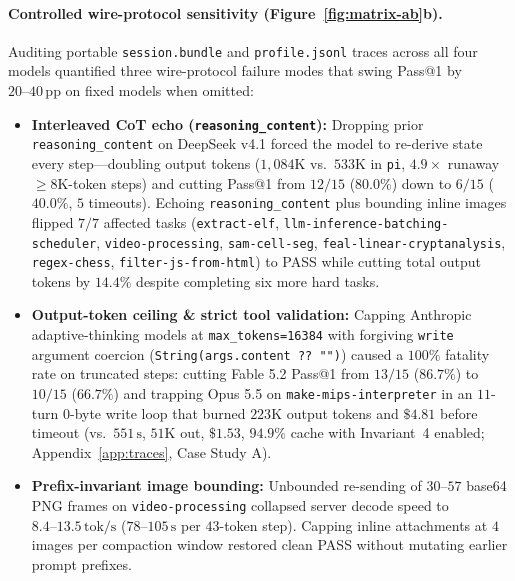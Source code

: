 \documentclass[11pt]{article}
\newcommand{\code}[1]{\nolinkurl{#1}}
\begin{document}
\paragraph{Controlled wire-protocol sensitivity (Figure~\ref{fig:matrix-ab}b).}
Auditing portable \texttt{session.bundle} and \texttt{profile.jsonl} traces across all four models quantified three wire-protocol failure modes that swing Pass@1 by $20\text{--}40\,\mathrm{pp}$ on fixed models when omitted:
\begin{itemize}[leftmargin=*,nosep]
  \item \textbf{Interleaved CoT echo (\texttt{reasoning\_content}):} Dropping prior \texttt{reasoning\_content} on DeepSeek v4.1 forced the model to re-derive state every step---doubling output tokens ($1{,}084\mathrm{K}$ vs.\ $533\mathrm{K}$ in \texttt{pi}, $4.9\times$ runaway $\ge 8\mathrm{K}$-token steps) and cutting Pass@1 from $12/15$ ($80.0\%$) down to $6/15$ ($40.0\%$, $5$ timeouts). Echoing \texttt{reasoning\_content} plus bounding inline images flipped $7/7$ affected tasks (\code{extract-elf}, \code{llm-inference-batching-scheduler}, \code{video-processing}, \code{sam-cell-seg}, \code{feal-linear-cryptanalysis}, \code{regex-chess}, \code{filter-js-from-html}) to PASS while cutting total output tokens by $14.4\%$ despite completing six more hard tasks.
  \item \textbf{Output-token ceiling \& strict tool validation:} Capping Anthropic adaptive-thinking models at \texttt{max\_tokens=16384} with forgiving \texttt{write} argument coercion (\texttt{String(args.content ?? "")}) caused a $100\%$ fatality rate on truncated steps: cutting Fable 5.2 Pass@1 from $13/15$ ($86.7\%$) to $10/15$ ($66.7\%$) and trapping Opus 5.5 on \code{make-mips-interpreter} in an $11$-turn $0$-byte write loop that burned $223\mathrm{K}$ output tokens and $\$4.81$ before timeout (vs.\ $551\,\mathrm{s}$, $51\mathrm{K}$ out, $\$1.53$, $94.9\%$ cache with Invariant~4 enabled; Appendix~\ref{app:traces}, Case Study A).
  \item \textbf{Prefix-invariant image bounding:} Unbounded re-sending of $30\text{--}57$ base64 PNG frames on \code{video-processing} collapsed server decode speed to $8.4\text{--}13.5\,\mathrm{tok/s}$ ($78\text{--}105\,\mathrm{s}$ per $43$-token step). Capping inline attachments at $4$ images per compaction window restored clean PASS without mutating earlier prompt prefixes.
\end{itemize}
\end{document}

